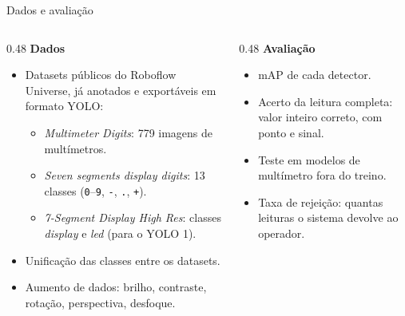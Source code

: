 \documentclass[aspectratio=169,10pt]{beamer}
\begin{document}
\begin{frame}{Dados e avaliação}
  \begin{columns}[T]
    \begin{column}{0.48\textwidth}
      \textbf{Dados}
      \begin{itemize}\small
        \item Datasets públicos do Roboflow Universe, já anotados e
              exportáveis em formato YOLO:
          \begin{itemize}\footnotesize
            \item \textit{Multimeter Digits}: 779 imagens de multímetros.
            \item \textit{Seven segments display digits}: 13 classes
                  (\texttt{0}--\texttt{9}, \texttt{-}, \texttt{.}, \texttt{+}).
            \item \textit{7-Segment Display High Res}: classes
                  \textit{display} e \textit{led} (para o YOLO 1).
          \end{itemize}
        \item Unificação das classes entre os datasets.
        \item Aumento de dados: brilho, contraste, rotação, perspectiva,
              desfoque.
      \end{itemize}
    \end{column}
    \begin{column}{0.48\textwidth}
      \textbf{Avaliação}
      \begin{itemize}\small
        \item mAP de cada detector.
        \item \alert{Acerto da leitura completa}: valor inteiro correto,
              com ponto e sinal.
        \item Teste em modelos de multímetro \alert{fora do treino}.
        \item Taxa de rejeição: quantas leituras o sistema devolve ao operador.
      \end{itemize}
    \end{column}
  \end{columns}
\end{frame}
\end{document}
